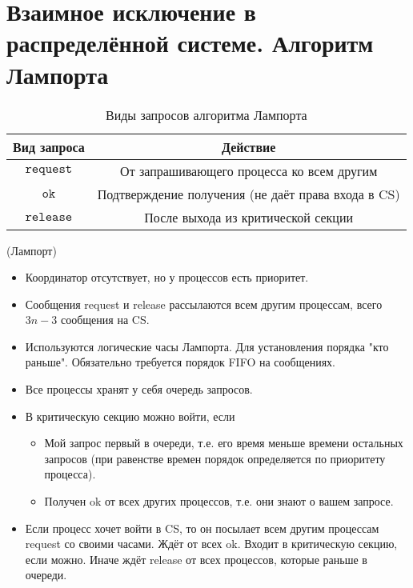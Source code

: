 \section{Взаимное исключение в распределённой системе. Алгоритм Лампорта}

\begin{table}[!ht]
    \centering
    \begin{tabular}{|c|c|} \hline
        Вид запроса & Действие \\ \hline
        $\texttt{request}$ & От запрашивающего процесса ко всем другим\\ \hline
        $\texttt{ok}$ & Подтверждение получения (не даёт права входа в CS) \\ \hline
        $\texttt{release}$ & После выхода из критической секции \\\hline
    \end{tabular}
    \caption{Виды запросов алгоритма Лампорта}
\end{table}

\begin{algorithm}(Лампорт)
\begin{itemize}
    \item Координатор отсутствует, но у процессов есть приоритет.
    \item Сообщения request и release рассылаются всем другим процессам, всего $3n-3$ сообщения на CS.
    \item Используются логические часы Лампорта.
        Для установления порядка "кто раньше".
        Обязательно требуется порядок FIFO на сообщениях.
    \item Все процессы хранят у себя очередь запросов.
    \item В критическую секцию можно войти, если
        \begin{itemize}
            \item Мой запрос первый в очереди, т.е. его время меньше времени 
                остальных запросов (при равенстве времен порядок определяется 
                по приоритету процесса).
            \item Получен ok от всех других процессов, т.е. они знают о вашем запросе.
        \end{itemize}
    \item Если процесс хочет войти в CS, то он посылает всем другим процессам request со
        своими часами. Ждёт от всех ok. Входит в критическую секцию, если можно.
        Иначе ждёт release от всех процессов, которые раньше в очереди.
\end{itemize}
\end{algorithm}

